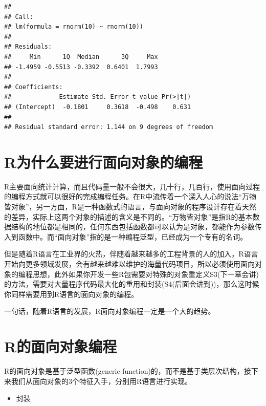 \documentclass[]{book}
\providecommand{\tightlist}{%
  \setlength{\itemsep}{0pt}\setlength{\parskip}{0pt}}
\begin{document}
\begin{verbatim}
## 
## Call:
## lm(formula = rnorm(10) ~ rnorm(10))
## 
## Residuals:
##     Min      1Q  Median      3Q     Max 
## -1.4959 -0.5513 -0.3392  0.6401  1.7993 
## 
## Coefficients:
##             Estimate Std. Error t value Pr(>|t|)
## (Intercept)  -0.1801     0.3618  -0.498    0.631
## 
## Residual standard error: 1.144 on 9 degrees of freedom
\end{verbatim}

\section{R为什么要进行面向对象的编程}\label{r}

R主要面向统计计算，而且代码量一般不会很大，几十行，几百行，使用面向过程的编程方式就可以很好的完成编程任务。在R中流传着一个深入人心的说法``万物皆对象''，另一方面，R是一种函数式的语言，与面向对象的程序设计存在着天然的差异，实际上这两个对象的描述的含义是不同的。``万物皆对象''是指R的基本数据结构的地位都是相同的，任何东西包括函数都可以认为是对象，都能作为参数传入到函数中。而``面向对象''指的是一种编程泛型，已经成为一个专有的名词。

但是随着R语言在工业界的火热，伴随着越来越多的工程背景的人的加入，R语言开始向更多领域发展，会有越来越难以维护的海量代码项目，所以必须使用面向对象的编程思想，此外如果你开发一些R包需要对特殊的对象重定义S3(下一章会讲)的方法，需要对大量程序代码最大化的重用和封装(S4(后面会讲到))，那么这时候你同样需要用到R语言的面向对象的编程。

一句话，随着R语言的发展，R面向对象编程一定是一个大的趋势。

\section{R的面向对象编程}\label{r}

R的面向对象是基于泛型函数(generic
function)的，而不是基于类层次结构，接下来我们从面向对象的3个特征入手，分别用R语言进行实现。

\begin{itemize}
\tightlist
\item
  封装
\end{itemize}
\end{document}
